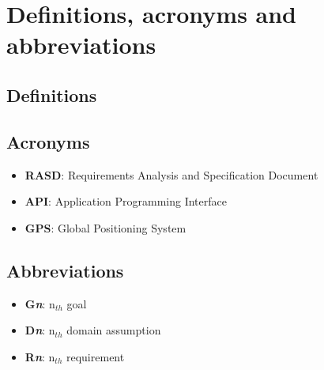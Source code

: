 \section{Definitions, acronyms and abbreviations}

\subsection{Definitions}

\subsection{Acronyms}
\begin{itemize}
  \item \textbf{RASD}: Requirements Analysis and Specification Document
  \item \textbf{API}: Application Programming Interface
  \item \textbf{GPS}: Global Positioning System
\end{itemize}

\subsection{Abbreviations}
\begin{itemize}
  \item \textbf{G\textit{n}}: n$_{th}$ goal
  \item \textbf{D\textit{n}}: n$_{th}$ domain assumption
  \item \textbf{R\textit{n}}: n$_{th}$ requirement
\end{itemize}